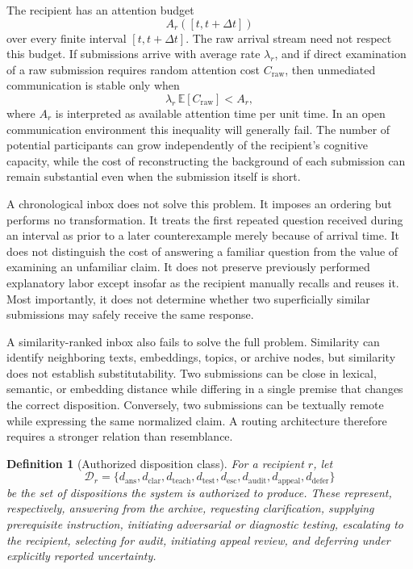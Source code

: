 \documentclass[11pt]{article}
\newtheorem{definition}{Definition}[section]
\theoremstyle{definition}
\newcommand{\E}{\mathbb{E}}
\newcommand{\D}{\mathcal{D}}
\begin{document}
The recipient has an attention budget
\[
A_r([t,t+\Delta t])
\]
over every finite interval \([t,t+\Delta t]\). The raw arrival stream need not respect this budget. If submissions arrive with average rate \(\lambda_r\), and if direct examination of a raw submission requires random attention cost \(C_{\mathrm{raw}}\), then unmediated communication is stable only when
\[
\lambda_r\,\E[C_{\mathrm{raw}}] < A_r,
\]
where \(A_r\) is interpreted as available attention time per unit time. In an open communication environment this inequality will generally fail. The number of potential participants can grow independently of the recipient's cognitive capacity, while the cost of reconstructing the background of each submission can remain substantial even when the submission itself is short.

A chronological inbox does not solve this problem. It imposes an ordering but performs no transformation. It treats the first repeated question received during an interval as prior to a later counterexample merely because of arrival time. It does not distinguish the cost of answering a familiar question from the value of examining an unfamiliar claim. It does not preserve previously performed explanatory labor except insofar as the recipient manually recalls and reuses it. Most importantly, it does not determine whether two superficially similar submissions may safely receive the same response.

A similarity-ranked inbox also fails to solve the full problem. Similarity can identify neighboring texts, embeddings, topics, or archive nodes, but similarity does not establish substitutability. Two submissions can be close in lexical, semantic, or embedding distance while differing in a single premise that changes the correct disposition. Conversely, two submissions can be textually remote while expressing the same normalized claim. A routing architecture therefore requires a stronger relation than resemblance.

\begin{definition}[Authorized disposition class]
For a recipient \(r\), let
\[
\D_r
=
\{
d_{\mathrm{ans}},
d_{\mathrm{clar}},
d_{\mathrm{teach}},
d_{\mathrm{test}},
d_{\mathrm{esc}},
d_{\mathrm{audit}},
d_{\mathrm{appeal}},
d_{\mathrm{defer}}
\}
\]
be the set of dispositions the system is authorized to produce. These represent, respectively, answering from the archive, requesting clarification, supplying prerequisite instruction, initiating adversarial or diagnostic testing, escalating to the recipient, selecting for audit, initiating appeal review, and deferring under explicitly reported uncertainty.
\end{definition}
\end{document}
